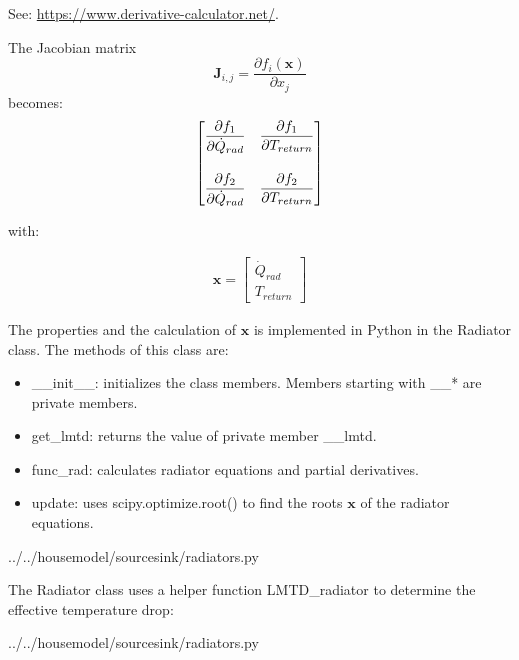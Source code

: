 See: \url{https://www.derivative-calculator.net/}.

The Jacobian matrix 
$$\mathbf{J}_{i,j}=\dfrac{\partial f_{i}(\mathbf{x})}{\partial x_{j}}$$
becomes:
\begin{equation}
	\begin{aligned}
		\begin{bmatrix}
			\dfrac{\partial f_1}{\partial \dot{Q}_{rad}} & \dfrac{\partial f_1}{\partial T_{return}} \\ 
			\vspace{2pt} \\
			\dfrac{\partial f_2}{\partial \dot{Q}_{rad}} & \dfrac{\partial f_2}{\partial T_{return}}
		\end{bmatrix}
	\end{aligned}
\end{equation} 

with:

\begin{equation}
	\begin{aligned}
		\mathbf{x} =
		\begin{bmatrix}
			\dot{Q}_{rad} \\ 
			T_{return}
		\end{bmatrix}
	\end{aligned}
\end{equation}

The properties and the calculation of $\mathbf{x}$ is implemented in Python in the \textsf{Radiator} class.
The methods of this class are:
\begin{itemize}
	\item \textsf{\_\_init\_\_}: initializes the class members. Members starting with \_\_* are private members.
	\item \textsf{get\_lmtd}: returns the value of private member \_\_lmtd.
	\item \textsf{func\_rad}: calculates radiator equations and partial derivatives.
	\item \textsf{update}: uses \textsf{scipy.optimize.root()} to find the roots $\mathbf{x}$ of the radiator equations.
\end{itemize}

 
{../../housemodel/sourcesink/radiators.py}

The Radiator class uses a helper function \textsf{LMTD\_radiator} to determine the effective temperature drop:

 
{../../housemodel/sourcesink/radiators.py}

